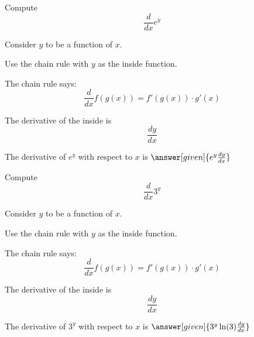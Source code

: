 \documentclass{ximera}
\begin{document}
\begin{question} %
  Compute
  \[
  \frac{d}{dx} e^y
  \]
  
	  
    \begin{hint}
      Consider $y$ to be a function of $x$.
    \end{hint}
    \begin{hint}
      Use the chain rule with $y$ as the inside function.
    \end{hint}
    \begin{hint}
      The chain rule says:
      \[
      \frac{d}{dx} f(g(x)) = f'(g(x))\cdot g'(x)
      \]
    \end{hint}
    \begin{hint}
      The derivative of the inside is 
      \[
      \frac{dy}{dx}
      \]
    \end{hint}
    
		The derivative of $e^y$ with respect to $x$ is
		 $\answer[given]{e^y \frac{dy}{dx}}$
		
\end{question}


\begin{question} %
  Compute
  \[
  \frac{d}{dx} 3^y
  \]
  
	  
    \begin{hint}
      Consider $y$ to be a function of $x$.
    \end{hint}
    \begin{hint}
      Use the chain rule with $y$ as the inside function.
    \end{hint}
    \begin{hint}
      The chain rule says:
      \[
      \frac{d}{dx} f(g(x)) = f'(g(x))\cdot g'(x)
      \]
    \end{hint}
    \begin{hint}
      The derivative of the inside is 
      \[
      \frac{dy}{dx}
      \]
    \end{hint}
    
		The derivative of $3^y$ with respect to $x$ is
		 $\answer[given]{3^y \ln(3) \frac{dy}{dx}}$
		
\end{question}
\end{document}
